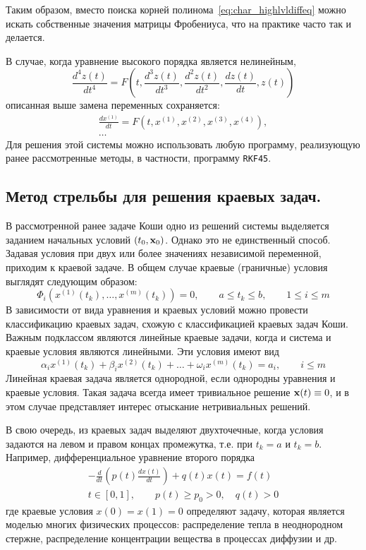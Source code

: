 Таким образом, вместо поиска корней полинома~\eqref{eq:char_highlvldiffeq} можно искать собственные значения
матрицы Фробениуса, что на практике часто так и делается.

В случае, когда уравнение высокого порядка является нелинейным,
\begin{equation*}
    \frac{d^4 z(t)}{dt^4} = F\left( t, \frac{d^3 z(t)}{dt^3}, \frac{d^2 z(t)}{dt^2}, \frac{dz(t)}{dt}, z(t) \right)
\end{equation*}
описанная выше замена переменных сохраняется:
\begin{gather*}
    \frac{dx^{(1)}}{dt} = F\left( t, x^{(1)}, x^{(2)}, x^{(3)}, x^{(4)} \right), \\
    \dots
\end{gather*}
Для решения этой системы можно использовать любую программу, реализующую ранее рассмотренные методы, в частности,
программу \verb|RKF45|.

\subsection{Метод стрельбы для решения краевых задач.}
В рассмотренной ранее задаче Коши одно из решений системы выделяется заданием начальных условий $(t_0, \bf{x}_0)$.
Однако это не единственный способ. Задавая условия при двух или более значениях независимой переменной, приходим к
краевой задаче. В общем случае краевые (граничные) условия выглядят следующим образом:
\begin{equation*}
    \Phi_i \left( x^{(1)}(t_k),\ldots, x^{(m)}(t_k) \right) = 0, \qquad a \leq t_k \leq b, \qquad 1 \leq i \leq m
\end{equation*}
В зависимости от вида уравнения и краевых условий можно провести классификацию краевых задач, схожую с классификацией
краевых задач Коши. Важным подклассом являются линейные краевые задачи, когда и система и краевые условия являются
линейными. Эти условия имеют вид
\begin{equation*}
    \alpha_i x^{(1)}(t_k) + \beta_i x^{(2)}(t_k) + \ldots + \omega_i x^{(m)}(t_k) = a_i, \qquad i \leq m
\end{equation*}
Линейная краевая задача является однородной, если однородны уравнения и краевые условия. Такая задача всегда имеет
тривиальное решение $\bf{x}(t) \equiv 0$, и в этом случае представляет интерес отыскание нетривиальных решений.

В свою очередь, из краевых задач выделяют двухточечные, когда условия задаются на левом и правом концах промежутка,
т.е. при $t_k = a$ и $t_k = b$. Например, дифференциальное уравнение второго порядка
\begin{gather*}
    -\frac{d}{dt} \left( p(t)\frac{dx(t)}{dt} \right) + q(t)x(t) = f(t)\\
    t \in [0, 1], \qquad p(t) \geq p_0 > 0, \quad q(t) > 0
\end{gather*}
где краевые условия $x(0) = x(1) = 0$ определяют задачу, которая является моделью многих физических процессов:
распределение тепла в неоднородном стержне, распределение концентрации вещества в процессах диффузии и др.

